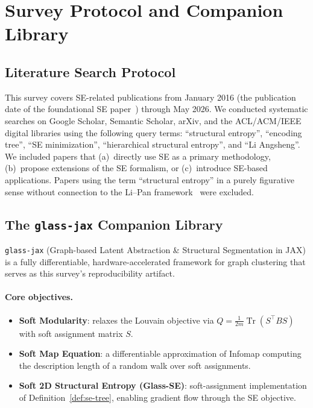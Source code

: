 \section{Survey Protocol and Companion Library}
\label{sec:appendix}

\subsection{Literature Search Protocol}

This survey covers SE-related publications from January 2016 (the publication
date of the foundational SE paper~\cite{Li2016}) through May 2026.
We conducted systematic searches on Google Scholar, Semantic Scholar, arXiv,
and the ACL/ACM/IEEE digital libraries using the following query terms:
``structural entropy'', ``encoding tree'', ``SE minimization'',
``hierarchical structural entropy'', and ``Li Angsheng''.
We included papers that (a)~directly use SE as a primary methodology,
(b)~propose extensions of the SE formalism, or (c)~introduce SE-based
applications.
Papers using the term ``structural entropy'' in a purely figurative sense
without connection to the Li--Pan framework~\cite{Li2016} were excluded.

\subsection{The \texttt{glass-jax} Companion Library}

\texttt{glass-jax} (Graph-based Latent Abstraction \& Structural Segmentation
in JAX) is a fully differentiable, hardware-accelerated framework for graph
clustering that serves as this survey's reproducibility artifact.

\paragraph{Core objectives.}
\begin{itemize}
  \item \textbf{Soft Modularity}: relaxes the Louvain objective via
        $Q = \frac{1}{2m}\operatorname{Tr}(S^\top B S)$ with soft assignment
        matrix $S$.
  \item \textbf{Soft Map Equation}: a differentiable approximation of Infomap
        computing the description length of a random walk over soft
        assignments.
  \item \textbf{Soft 2D Structural Entropy (Glass-SE)}: soft-assignment
        implementation of Definition~\ref{def:se-tree}, enabling gradient
        flow through the SE objective.
\end{itemize}

